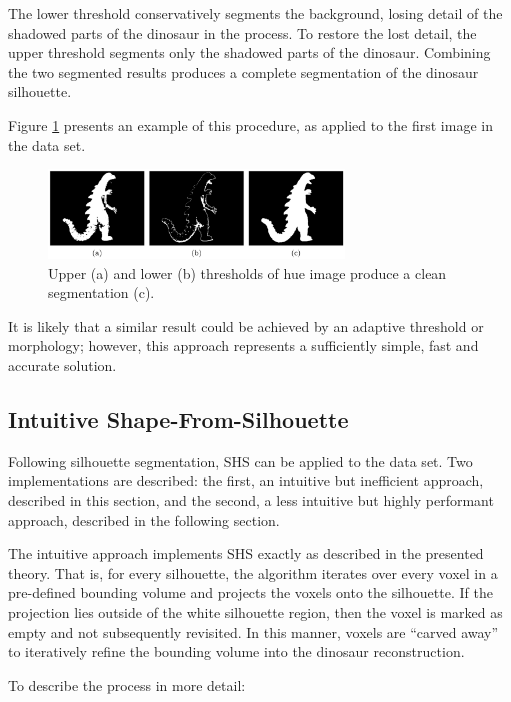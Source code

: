 The lower threshold conservatively segments the background, losing detail of the shadowed parts of the dinosaur in the process. To restore the lost detail, the upper threshold segments only the shadowed parts of the dinosaur. Combining the two segmented results produces a complete segmentation of the dinosaur silhouette.

Figure \ref{fig:thresholds} presents an example of this procedure, as applied to the first image in the data set.

\begin{figure}[ht]
  \centering
  \includegraphics[width=0.7\textwidth]{images/q2_thresholds.png}
  \caption{Upper (a) and lower (b) thresholds of hue image produce a clean segmentation (c).}
  \label{fig:thresholds}
\end{figure}

It is likely that a similar result could be achieved by an adaptive threshold or morphology; however, this approach represents a sufficiently simple, fast and accurate solution.

\newpage
\subsection{Intuitive Shape-From-Silhouette}

Following silhouette segmentation, SHS can be applied to the data set. Two implementations are described: the first, an intuitive but inefficient approach, described in this section, and the second, a less intuitive but highly performant approach, described in the following section.

The intuitive approach implements SHS exactly as described in the presented theory. That is, for every silhouette, the algorithm iterates over every voxel in a pre-defined bounding volume and projects the voxels onto the silhouette. If the projection lies outside of the white silhouette region, then the voxel is marked as empty and not subsequently revisited. In this manner, voxels are ``carved away'' to iteratively refine the bounding volume into the dinosaur reconstruction.

To describe the process in more detail:

